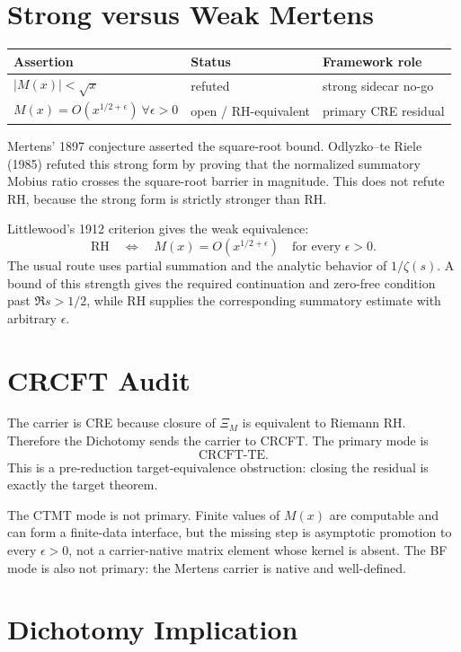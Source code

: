 \documentclass[11pt]{article}
\begin{document}
\section*{Strong versus Weak Mertens}

\begin{center}
\begin{tabular}{lll}
\toprule
Assertion & Status & Framework role\\
\midrule
\(|M(x)|<\sqrt{x}\) & refuted & strong sidecar no-go\\
\(M(x)=O(x^{1/2+\epsilon})\ \forall\epsilon>0\) & open / RH-equivalent & primary CRE residual\\
\bottomrule
\end{tabular}
\end{center}

Mertens' 1897 conjecture asserted the square-root bound.  Odlyzko--te Riele
(1985) refuted this strong form by proving that the normalized summatory
Mobius ratio crosses the square-root barrier in magnitude.  This does not
refute RH, because the strong form is strictly stronger than RH.

Littlewood's 1912 criterion gives the weak equivalence:
\[
  \mathrm{RH}
  \quad\Longleftrightarrow\quad
  M(x)=O(x^{1/2+\epsilon})\quad\text{for every }\epsilon>0.
\]
The usual route uses partial summation and the analytic behavior of
\(1/\zeta(s)\).  A bound of this strength gives the required continuation and
zero-free condition past \(\Re s>1/2\), while RH supplies the corresponding
summatory estimate with arbitrary \(\epsilon\).

\section*{CRCFT Audit}

The carrier is CRE because closure of \(\Xi_M\) is equivalent to Riemann RH.
Therefore the Dichotomy sends the carrier to CRCFT.  The primary mode is
\[
  \mathrm{CRCFT\mbox{-}TE}.
\]
This is a pre-reduction target-equivalence obstruction: closing the residual
is exactly the target theorem.

The CTMT mode is not primary.  Finite values of \(M(x)\) are computable and
can form a finite-data interface, but the missing step is asymptotic
promotion to every \(\epsilon>0\), not a carrier-native matrix element whose
kernel is absent.  The BF mode is also not primary: the Mertens carrier is
native and well-defined.

\section*{Dichotomy Implication}
\end{document}

